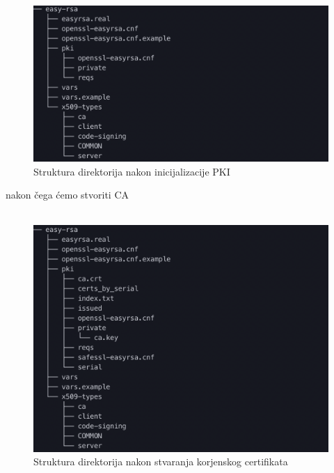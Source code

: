          \\
        
        \begin{figure}[H]
            \centering
            \includegraphics[scale=0.5]{slike/afterPkiInit}
            \caption{Struktura direktorija nakon inicijalizacije PKI}
        \end{figure}
        
        \noindent
        nakon čega ćemo stvoriti CA  \\

        \noindent
         \\
        
        \begin{figure}[H]
            \centering
            \includegraphics[scale=0.5]{slike/afterBuildCa}
            \caption{Struktura direktorija nakon stvaranja korjenskog
            certifikata}
        \end{figure}


